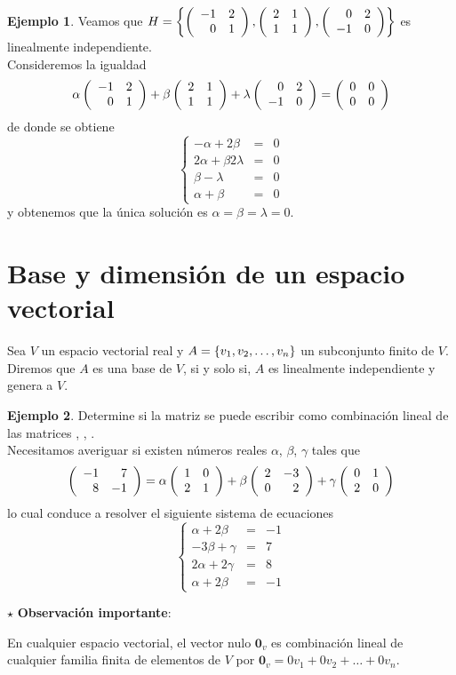 \documentclass[10pt,a4paper]{report}
\theoremstyle{definition}
\newtheorem{ejemplo}{Ejemplo}[chapter]
\theoremstyle{remark}
\numberwithin{section}{chapter}
\numberwithin{equation}{chapter}
\numberwithin{tacounter}{chapter}
\newenvironment{obsimp}[0]
    {\noindent$\star$ \textbf{Observación importante}:
  \itshape
    }
    { 
    \\
    }
\begin{document}
\begin{ejemplo}

Veamos que $H = \left\{ \matrdxd{-1 & 2}{0 & 1}, \matrdxd{2 & 1}{1 & 1} , \matrdxd{0 & 2}{-1 & 0} \right \}$ es linealmente independiente.\\
Consideremos la igualdad
$$\alpha \matrdxd {-1 & 2}{0&1} + \beta \matrdxd {2&1}{1&1} + \lambda \matrdxd {0 & 2}{-1 & 0} = \matrdxd {0&0}{0&0}$$
de donde se obtiene
$$\left\{
\begin{array}{rcl}
-\alpha + 2\beta &=&0\\
2\alpha +\beta 2\lambda &=&0\\
\beta - \lambda &=& 0\\
\alpha + \beta &=&0

\end{array}
\right.$$
y obtenemos que la única solución es $\alpha = \beta = \lambda = 0$.\\
\end{ejemplo}

\section{Base y dimensión de un espacio vectorial}
Sea $V$ un espacio vectorial real y $A=  \lbrace v_1, v_2, \ldots, v_n \rbrace$ un subconjunto finito de $V$. Diremos que $A$ es una base de $V$, si y solo si, $A$ es linealmente independiente y genera  a $V$.

\begin{ejemplo}
Determine si la matriz  se puede escribir como combinación lineal de las matrices  ,  , . \\
Necesitamos averiguar si existen números reales $\alpha$, $\beta$, $\gamma$ tales que
$$\matrdxd {-1&7}{8&-1} = \alpha \matrdxd {1&0}{2&1} + \beta \matrdxd {2&-3}{0&2} + \gamma \matrdxd {0&1}{2&0}$$
lo cual conduce a resolver el siguiente sistema de ecuaciones
$$\left\{
\begin{array}{rcr}
\alpha + 2\beta &=&-1\\
-3\beta + \gamma &=&7\\
2\alpha + 2 \gamma &=& 8\\
\alpha +2\beta &=& -1

\end{array}
\right.$$

\end{ejemplo}

\begin{obsimp}
En cualquier espacio vectorial, el vector nulo $\mathbf{0}_v$ es combinación lineal de cualquier familia finita de elementos de $V$  por $\mathbf{0}_v = 0 v_1 + 0 v_2 + \ldots + 0 v_n$.\\
\end{obsimp}
\end{document}
